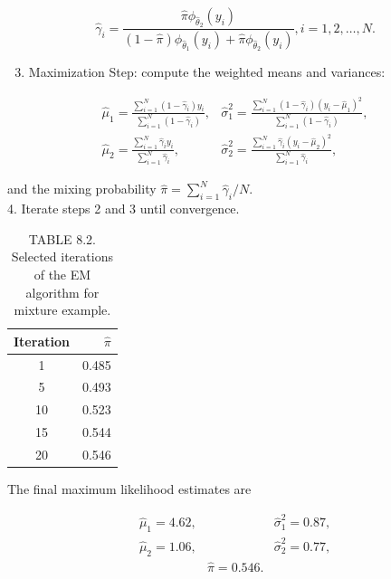 \documentclass[10pt]{article}
\begin{document}
\begin{equation*}
\hat{\gamma}_{i}=\frac{\hat{\pi} \phi_{\hat{\theta}_{2}}\left(y_{i}\right)}{(1-\hat{\pi}) \phi_{\hat{\theta}_{1}}\left(y_{i}\right)+\hat{\pi} \phi_{\hat{\theta}_{2}}\left(y_{i}\right)}, i=1,2, \ldots, N . \tag{8.42}
\end{equation*}


\begin{enumerate}
  \setcounter{enumi}{2}
  \item Maximization Step: compute the weighted means and variances:
\end{enumerate}

$$
\begin{aligned}
\hat{\mu}_{1}=\frac{\sum_{i=1}^{N}\left(1-\hat{\gamma}_{i}\right) y_{i}}{\sum_{i=1}^{N}\left(1-\hat{\gamma}_{i}\right)}, & \hat{\sigma}_{1}^{2}=\frac{\sum_{i=1}^{N}\left(1-\hat{\gamma}_{i}\right)\left(y_{i}-\hat{\mu}_{1}\right)^{2}}{\sum_{i=1}^{N}\left(1-\hat{\gamma}_{i}\right)}, \\
\hat{\mu}_{2}=\frac{\sum_{i=1}^{N} \hat{\gamma}_{i} y_{i}}{\sum_{i=1}^{N} \hat{\gamma}_{i}}, & \hat{\sigma}_{2}^{2}=\frac{\sum_{i=1}^{N} \hat{\gamma}_{i}\left(y_{i}-\hat{\mu}_{2}\right)^{2}}{\sum_{i=1}^{N} \hat{\gamma}_{i}},
\end{aligned}
$$

and the mixing probability $\hat{\pi}=\sum_{i=1}^{N} \hat{\gamma}_{i} / N$.\\
4. Iterate steps 2 and 3 until convergence.

\begin{table}[h]
\begin{center}
\captionsetup{labelformat=empty}
\caption{TABLE 8.2. Selected iterations of the EM algorithm for mixture example.}
\begin{tabular}{cr}
\hline
Iteration & $\hat{\pi}$ \\
\hline
1 & 0.485 \\
5 & 0.493 \\
10 & 0.523 \\
15 & 0.544 \\
20 & 0.546 \\
\hline
\end{tabular}
\end{center}
\end{table}

The final maximum likelihood estimates are

$$
\begin{array}{lll}
\hat{\mu}_{1}=4.62, & & \hat{\sigma}_{1}^{2}=0.87, \\
\hat{\mu}_{2}=1.06, & & \hat{\sigma}_{2}^{2}=0.77, \\
& \hat{\pi}=0.546 . &
\end{array}
$$
\end{document}
